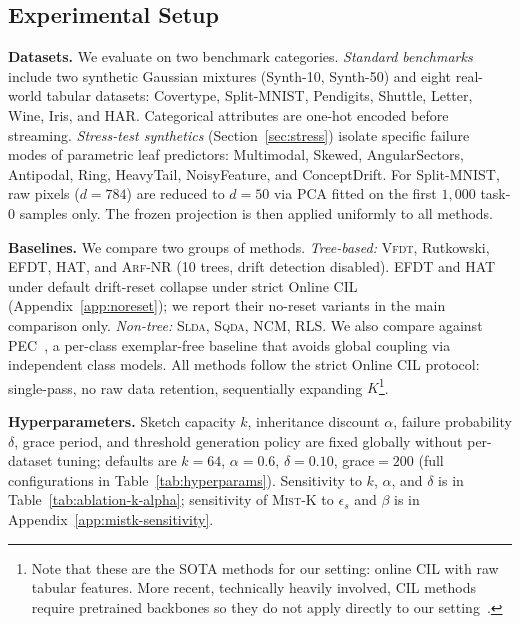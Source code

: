 \documentclass{article}
\newcommand{\mist}{\textsc{Mist}}
\newcommand{\vfdt}{\textsc{Vfdt}}
\newcommand{\slda}{\textsc{Slda}}
\newcommand{\sqda}{\textsc{Sqda}}
\newcommand{\arf}{\textsc{Arf}}
\begin{document}
\subsection{Experimental Setup}
\label{sec:setup}

\noindent
\textbf{Datasets.}
We evaluate on two benchmark categories. \emph{Standard benchmarks} include
two synthetic Gaussian mixtures (Synth-10, Synth-50) and eight real-world
tabular datasets: Covertype, Split-MNIST, Pendigits, Shuttle, Letter, Wine,
Iris, and HAR. Categorical attributes are one-hot encoded before streaming.
\emph{Stress-test synthetics} (Section~\ref{sec:stress}) isolate specific
failure modes of parametric leaf predictors: Multimodal, Skewed,
AngularSectors, Antipodal, Ring, HeavyTail, NoisyFeature, and ConceptDrift.
For Split-MNIST, raw pixels ($d{=}784$) are reduced to $d{=}50$ via PCA
fitted on the first $1{,}000$ task-0 samples only. The frozen projection is
then applied uniformly to all methods.

\noindent
\textbf{Baselines.}
We compare two groups of methods. \emph{Tree-based:} \vfdt{}, Rutkowski,
EFDT, HAT, and \arf{}-NR (10 trees, drift detection disabled). EFDT and HAT
under default drift-reset collapse under strict Online CIL
(Appendix~\ref{app:noreset}); we report their no-reset variants in the main
comparison only. \emph{Non-tree:} \slda{}, \sqda{}, NCM, RLS. We also compare against PEC~\cite{zajkac2024}, a per-class exemplar-free baseline that avoids global coupling via independent class models. All
methods follow the strict Online CIL protocol: single-pass, no raw data
retention, sequentially expanding $K$\footnote{Note that these are the SOTA methods for our setting: online CIL with raw tabular features. More recent, technically heavily involved, CIL methods require pretrained backbones so they do not apply directly to our setting~\cite{goswami2023fecam, zhuang2024gacl, petit2023fetril}.}. 

\noindent
\textbf{Hyperparameters.}
Sketch capacity $k$, inheritance discount $\alpha$, failure probability
$\delta$, grace period, and threshold generation policy are fixed globally
without per-dataset tuning; defaults are $k{=}64$, $\alpha{=}0.6$,
$\delta{=}0.10$, grace${=}200$ (full configurations in
Table~\ref{tab:hyperparams}). Sensitivity to $k$, $\alpha$, and
$\delta$ is in Table~\ref{tab:ablation-k-alpha}; sensitivity of
\mist{}-K to $\epsilon_s$ and $\beta$ is in
Appendix~\ref{app:mistk-sensitivity}.
\end{document}
